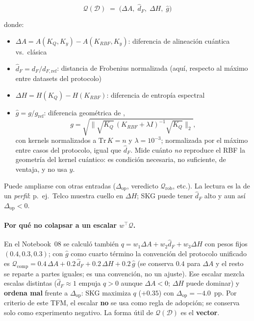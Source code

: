 \begin{equation}
    \mathcal{Q}(\mathcal{D})
    \;=\;
    \bigl(\Delta A,\; \hat{d}_F,\; \Delta H,\; \hat{g}\bigr)
    \label{eq:score_cuanticidad}
\end{equation}

donde:
\begin{itemize}
    \item $\Delta A = A(K_Q, K_y) - A(K_{RBF}, K_y)$: diferencia de alineación cuántica vs.\ clásica
    \item $\hat{d}_F = d_F / d_{F,\mathrm{ref}}$: distancia de Frobenius normalizada (aquí, respecto al máximo entre datasets del protocolo)
    \item $\Delta H = H(K_Q) - H(K_{RBF})$: diferencia de entropía espectral
    \item $\hat{g} = g / g_{\mathrm{ref}}$: diferencia geométrica de \citet{huang2021},
    \[ g=\sqrt{\bigl\|\sqrt{K_Q}\,(K_{RBF}+\lambda I)^{-1}\sqrt{K_Q}\bigr\|_2}, \]
    con kernels normalizados a $\mathrm{Tr}\,K=n$ y $\lambda=10^{-3}$; normalizada por el máximo entre casos del protocolo, igual que $\hat d_F$. Mide cuánto \emph{no} reproduce el RBF la geometría del kernel cuántico: es condición necesaria, no suficiente, de ventaja, y no usa $y$.
\end{itemize}

Puede ampliarse con otras entradas ($\Delta_{\mathrm{op}}$, veredicto $\mathcal{Q}_{\mathrm{rob}}$, etc.). La lectura es la de un \emph{perfil}: p.~ej.\ Telco muestra cuello en $\Delta H$; SKG puede tener $\hat{d}_F$ alto y aun así $\Delta_{\mathrm{op}}<0$.

\paragraph{Por qué no colapsar a un escalar $w^\top\mathcal{Q}$.}
En el Notebook~08 se calculó también $q=w_1\Delta A+w_2\hat{d}_F+w_3\Delta H$ con pesos fijos $(0.4,0.3,0.3)$; con $\hat g$ como cuarto término la convención del protocolo unificado es $\mathcal{Q}_{\mathrm{comp}}=0.4\,\Delta A+0.2\,\hat d_F+0.2\,\Delta H+0.2\,\hat g$ (se conserva $0.4$ para $\Delta A$ y el resto se reparte a partes iguales; es una convención, no un ajuste). Ese escalar mezcla escalas distintas ($\hat{d}_F\!\approx\!1$ empuja $q>0$ aunque $\Delta A<0$; $\Delta H$ puede dominar) y \textbf{ordena mal} frente a $\Delta_{\mathrm{op}}$: SKG maximiza $q$ ($+0.35$) con $\Delta_{\mathrm{op}}=-4.0$~pp. Por criterio de este TFM, el escalar \textbf{no} se usa como regla de adopción; se conserva solo como experimento negativo. La forma útil de $\mathcal{Q}(\mathcal{D})$ es el \textbf{vector}.

